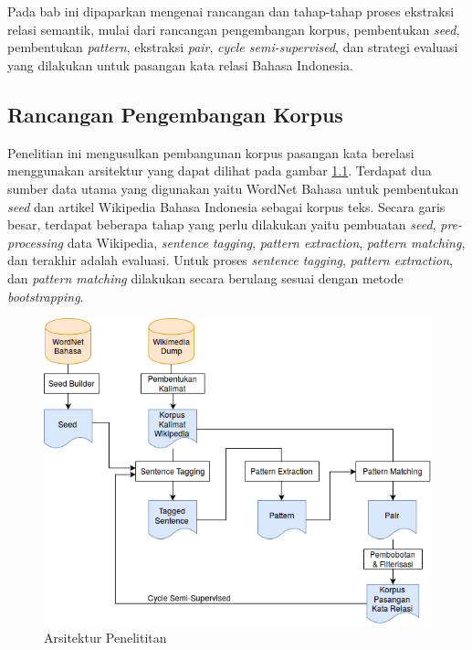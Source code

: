 \chapter{\babTiga}
Pada bab ini dipaparkan mengenai rancangan dan tahap-tahap proses ekstraksi relasi semantik, mulai dari rancangan pengembangan korpus, pembentukan \textit{seed}, pembentukan \textit{pattern}, ekstraksi \textit{pair}, \textit{cycle semi-supervised}, dan strategi evaluasi yang dilakukan untuk pasangan kata relasi Bahasa Indonesia. 


\section{Rancangan Pengembangan Korpus}
Penelitian ini mengusulkan pembangunan korpus pasangan kata berelasi menggunakan arsitektur yang dapat dilihat pada gambar \ref{fig:arsitektur-penelitian}. Terdapat dua sumber data utama yang digunakan yaitu WordNet Bahasa untuk pembentukan \textit{seed} dan artikel Wikipedia Bahasa Indonesia sebagai korpus teks. Secara garis besar, terdapat beberapa tahap yang perlu dilakukan yaitu pembuatan \textit{seed}, \textit{pre-processing} data Wikipedia, \textit{sentence tagging}, \textit{pattern extraction}, \textit{pattern matching}, dan terakhir adalah evaluasi. Untuk proses \textit{sentence tagging}, \textit{pattern extraction}, dan \textit{pattern matching} dilakukan secara berulang sesuai dengan metode \textit{bootstrapping}. 

\begin{figure}
    \centering
    \includegraphics[scale=0.55]{pics/Pic01-SemiSupervisedCycle}
    \caption{Arsitektur Penelititan}
    \label{fig:arsitektur-penelitian}
\end{figure}

